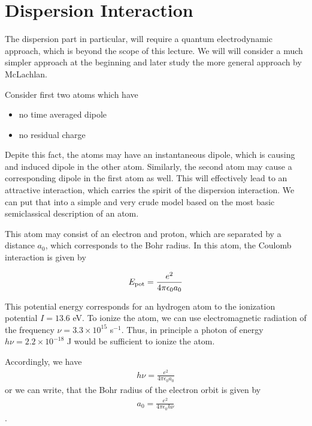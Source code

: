 \documentclass[letterpaper,10pt,english]{sphinxmanual}
\begin{document}
\section{Dispersion Interaction}
\label{\detokenize{notebooks/L10/1_van_der_Waals:Dispersion-Interaction}}
\sphinxAtStartPar
The dispersion part in particular, will require a quantum electrodynamic approach, which is beyond the scope of this lecture. We will will consider a much simpler approach at the beginning and later study the more general approach by McLachlan.

\sphinxAtStartPar
Consider first two atoms which have
\begin{itemize}
\item {} 
\sphinxAtStartPar
no time averaged dipole

\item {} 
\sphinxAtStartPar
no residual charge

\end{itemize}

\sphinxAtStartPar
Depite this fact, the atoms may have an instantaneous dipole, which is causing and induced dipole in the other atom. Similarly, the second atom may cause a corresponding dipole in the first atom as well. This will effectively lead to an attractive interaction, which carries the spirit of the dispersion interaction. We can put that into a simple and very crude model based on the most basic semi\sphinxhyphen{}classical description of an atom.

\sphinxAtStartPar
This atom may consist of an electron and proton, which are separated by a distance \(a_0\), which corresponds to the Bohr radius. In this atom, the Coulomb interaction is given by

\sphinxAtStartPar
\begin{equation}
E_{\rm pot}=\frac{e^2}{4\pi \epsilon_0 a_0}
\end{equation}

\sphinxAtStartPar
This potential energy corresponds for an hydrogen atom to the ionization potential \(I=13.6\) eV. To ionize the atom, we can use electromagnetic radiation of the frequency \(\nu=3.3\times 10 ^{15}\) s\(^{-1}\). Thus, in principle a photon of energy \(h\nu=2.2\times 10^{-18}\) J would be sufficient to ionize the atom.

\sphinxAtStartPar
Accordingly, we have
\begin{equation*}
\begin{split}h \nu= \frac{e^2}{4\pi \epsilon_0 a_0}\end{split}
\end{equation*}
\sphinxAtStartPar
or we can write, that the Bohr radius of the electron orbit is given by
\begin{equation*}
\begin{split}a_0=\frac{e^2}{4\pi\epsilon_0 h\nu}\end{split}
\end{equation*}
\sphinxAtStartPar
.
\end{document}
